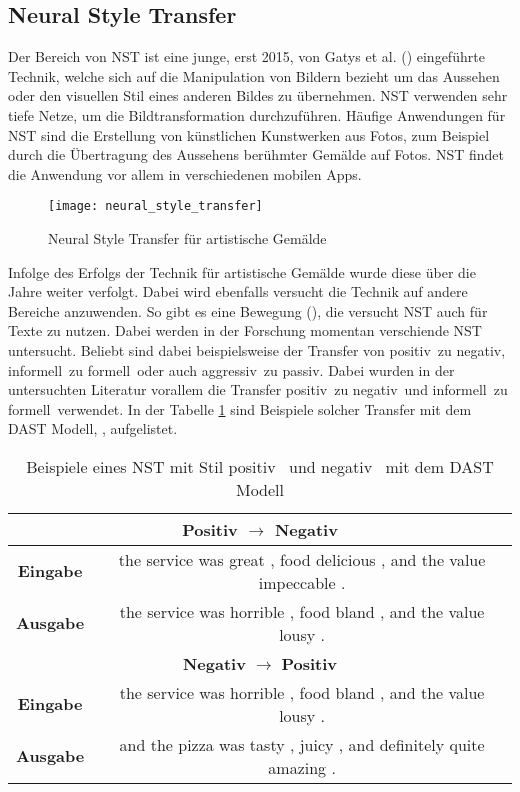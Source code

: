 \subsection{Neural Style Transfer}
\label{sub:neural-style-transfer}
Der Bereich von \gls{NST} ist eine junge, erst 2015, von Gatys et al. (\cite{gatys2015neural}) eingeführte Technik,
welche sich auf die Manipulation von Bildern bezieht um das Aussehen oder den visuellen Stil eines anderen Bildes zu
übernehmen. \gls{NST} verwenden sehr tiefe Netze, um die Bildtransformation durchzuführen. Häufige Anwendungen für
\gls{NST} sind die Erstellung von künstlichen Kunstwerken aus Fotos, zum Beispiel durch die Übertragung des Aussehens
berühmter Gemälde auf Fotos. \gls{NST} findet die Anwendung vor allem in verschiedenen mobilen Apps.
\begin{figure}[H]
	\centering
	\texttt{[image: neural\_style\_transfer]}
	\caption{Neural Style Transfer für artistische Gemälde}
	\label{fig:neural-style-transfer}
\end{figure}
\noindent
Infolge des Erfolgs der Technik für artistische Gemälde wurde diese über die Jahre weiter verfolgt. Dabei wird ebenfalls
versucht die Technik auf andere Bereiche anzuwenden. So gibt es eine Bewegung (\cite{fuzhenxin_2019}), die versucht
\gls{NST} auch für Texte zu nutzen. 
\newline
\newline
Dabei werden in der Forschung momentan verschiende \gls{NST} untersucht. Beliebt sind dabei beispielsweise der Transfer
von \flqq positiv\frqq \ zu \flqq negativ\frqq, \flqq informell\frqq \ zu \flqq formell\frqq \ oder auch \flqq
aggressiv\frqq \ zu \flqq passiv\frqq. Dabei wurden in der untersuchten Literatur vorallem die Transfer \flqq
positiv\frqq \ zu \flqq negativ\frqq \ und \flqq informell\frqq \ zu \flqq formell\frqq \ verwendet. In der Tabelle
\ref{tab:beispiele_nst_nlp} sind Beispiele solcher Transfer mit dem \gls{DAST} Modell, \cite{Li2019DomainAT},
aufgelistet.
\begin{table}[H]
	\centering
	\begin{tabular}{|c|c|}
		\hline
		\multicolumn{2}{|c|}{\textbf{Positiv} $\rightarrow$ \textbf{Negativ} } \\
		\hline
		\textbf{Eingabe} &  the service was great , food delicious , and the value impeccable . \\
		\textbf{Ausgabe} & the service was horrible , food bland , and the value lousy . \\
		\hline
		\multicolumn{2}{|c|}{\textbf{Negativ} $\rightarrow$ \textbf{Positiv}} \\
		\hline
		\textbf{Eingabe} & the service was horrible , food bland , and the value lousy . \\
		\textbf{Ausgabe} & and the pizza was tasty , juicy , and definitely quite amazing . \\
		\hline
	\end{tabular}
	\caption{Beispiele eines \gls{NST} mit Stil \flqq positiv \frqq \ und \flqq negativ \frqq \ mit dem \gls{DAST} Modell}
  \label{tab:beispiele_nst_nlp}
  \end{table}
